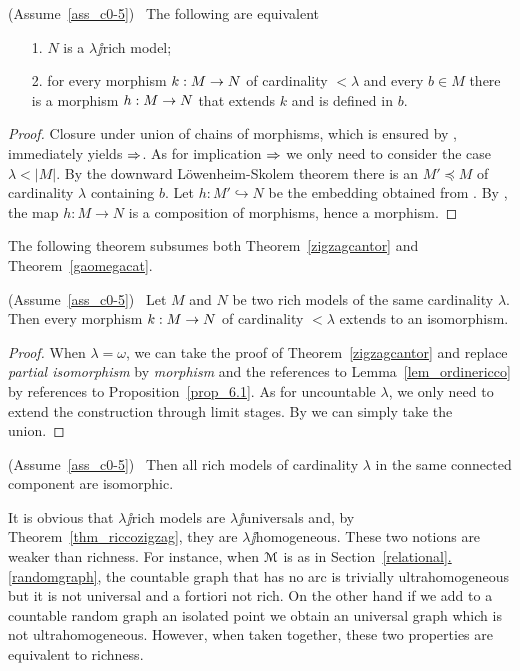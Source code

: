 \documentclass[creche.tex]{subfiles}
\begin{document}
\begin{proposition}\label{prop_6.1}
(Assume~\ref{ass_c0-5})  \  The following are equivalent
\begin{itemize}
\item[1.] $N$ is a $\lambda\jj$rich model;
\item[2.]for every morphism $k:M\rightarrow N$ of cardinality $<\lambda$ and every $b\in M$ there is a morphism $h:M\rightarrow N$ that extends $k$ and is defined in $b$.
\end{itemize}
\end{proposition}
\begin{proof}
Closure under union of chains of morphisms, which is ensured by , immediately yields $\Rightarrow$. As for implication $\Rightarrow$ we only need to consider the case $\lambda<|M|$.  By the downward L\"owenheim-Skolem theorem there is an  $M'\preceq M$ of cardinality $\lambda$ containing $b$. Let $h:M'\hookrightarrow N$ be the embedding obtained from . By , the map  $h:M\to N$ is a composition of morphisms, hence a morphism.
\end{proof}

The following theorem subsumes both Theorem~\ref{zigzagcantor} and Theorem~\ref{gaomegacat}.

\begin{theorem}\label{thm_riccozigzag}
(Assume~\ref{ass_c0-5})  \  Let $M$ and $N$ be two rich models of the same cardinality $\lambda$. Then every morphism $k:M\rightarrow N$ of cardinality $<\lambda$ extends to an isomorphism.
\end{theorem}

\begin{proof}
When $\lambda=\omega$, we can take the proof of Theorem~\ref{zigzagcantor} and replace \textit{partial isomorphism\/} by \textit{morphism\/} and the references to Lemma~\ref{lem_ordinericco} by references to Proposition~\ref{prop_6.1}. As for uncountable $\lambda$, we only need to extend the construction through limit stages. By  we can simply take the union.
\end{proof}


\begin{corollary}\label{coroll_riccozigzag}
(Assume~\ref{ass_c0-5})  \  Then all rich models of cardinality $\lambda$ in the same connected component are isomorphic.\QED
\end{corollary}

It is obvious that $\lambda\jj$rich models are $\lambda\jj$universals and, by Theorem~\ref{thm_riccozigzag}, they are $\lambda\jj$ho\-mo\-ge\-ne\-ous. These two notions are weaker than richness. For instance, when $\EuScript M$ is as in Section~\hyperref[randomgraph]{\ref*{relational}.\ref*{randomgraph}}, the countable graph that has no arc is trivially ultrahomogeneous but it is not universal and a fortiori not rich. On the other hand if we add to a countable random graph an isolated point we obtain an universal graph which is not ultrahomogeneous. However, when taken together, these two properties are equivalent to richness.
\end{document}
